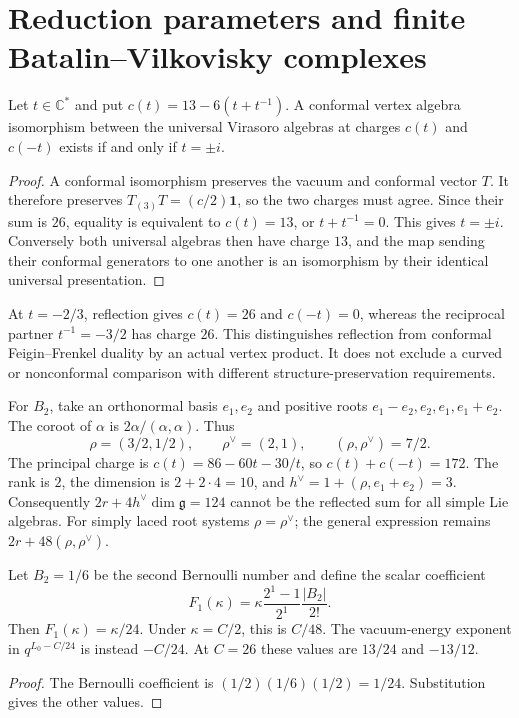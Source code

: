 \section{Reduction parameters and finite Batalin--Vilkovisky complexes}

\begin{proposition}
\label{prop:cbc26-conformal-reflection}
Let $t\in\mathbb C^*$ and put $c(t)=13-6(t+t^{-1})$.
A conformal vertex algebra isomorphism between the universal Virasoro algebras at charges $c(t)$ and $c(-t)$ exists if and only if $t=\pm i$.
\end{proposition}
\begin{proof}
A conformal isomorphism preserves the vacuum and conformal vector $T$.
It therefore preserves $T_{(3)}T=(c/2)\mathbf1$, so the two charges must agree.
Since their sum is $26$, equality is equivalent to $c(t)=13$, or $t+t^{-1}=0$.
This gives $t=\pm i$.
Conversely both universal algebras then have charge $13$, and the map sending their conformal generators to one another is an isomorphism by their identical universal presentation.
\end{proof}

At $t=-2/3$, reflection gives $c(t)=26$ and $c(-t)=0$, whereas the reciprocal partner $t^{-1}=-3/2$ has charge $26$.
This distinguishes reflection from conformal Feigin--Frenkel duality by an actual vertex product.
It does not exclude a curved or nonconformal comparison with different structure-preservation requirements.

\begin{example}
\label{ex:cbc26-b2}
For $B_2$, take an orthonormal basis $e_1,e_2$ and positive roots $e_1-e_2,e_2,e_1,e_1+e_2$.
The coroot of $\alpha$ is $2\alpha/(\alpha,\alpha)$.
Thus
\[
 \rho=(3/2,1/2),\qquad\rho^\vee=(2,1),\qquad
 (\rho,\rho^\vee)=7/2.
\]
The principal charge is $c(t)=86-60t-30/t$, so $c(t)+c(-t)=172$.
The rank is $2$, the dimension is $2+2\cdot4=10$, and $h^\vee=1+(\rho,e_1+e_2)=3$.
Consequently $2r+4h^\vee\dim\mathfrak g=124$ cannot be the reflected sum for all simple Lie algebras.
For simply laced root systems $\rho=\rho^\vee$; the general expression remains $2r+48(\rho,\rho^\vee)$.
\end{example}

\begin{proposition}
\label{prop:cbc26-genus-one-normalization}
Let $B_2=1/6$ be the second Bernoulli number and define the scalar coefficient
\[
 F_1(\kappa)=\kappa\frac{2^1-1}{2^1}\frac{|B_2|}{2!}.
\]
Then $F_1(\kappa)=\kappa/24$.
Under $\kappa=C/2$, this is $C/48$.
The vacuum-energy exponent in $q^{L_0-C/24}$ is instead $-C/24$.
At $C=26$ these values are $13/24$ and $-13/12$.
\end{proposition}
\begin{proof}
The Bernoulli coefficient is $(1/2)(1/6)(1/2)=1/24$.
Substitution gives the other values.
\end{proof}

